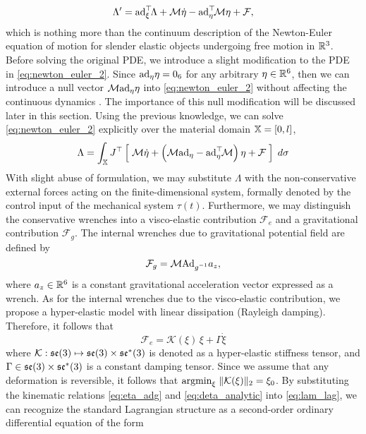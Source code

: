 %
\begin{equation}
\Lambda' =  \text{ad}_{{\xi}}^\top \! \Lambda + \mathcal{M} \dot{{\eta}} - \text{ad}_{{\eta}}^\top \! \mathcal{M} {\eta}  +  \mathcal{F}, \label{eq:newton_euler_2}
\end{equation}
%
which is nothing more than the continuum description of the Newton-Euler equation of motion for slender elastic objects undergoing free motion in $\mathbb{R}^3$. Before solving the original PDE, we introduce a slight modification to the PDE in \eqref{eq:newton_euler_2}. Since $\text{ad}_{\eta} \eta = 0_6$ for any arbitrary $\eta \in \mathbb{R}^6$, then we can introduce a null vector $\mathcal{M}\text{ad}_{\eta} \eta$ into \eqref{eq:newton_euler_2} without affecting the continuous dynamics \cite{Garofalo2013}. The importance of this null modification will be discussed later in this section. Using the previous knowledge, we can solve \eqref{eq:newton_euler_2} explicitly over the material domain $\mathbb{X}= [0,l]$,
%
\begin{equation}
\Lambda = \int_{\mathbb{X}} J^\top \left[ \; {}\mathcal{M} \dot{{\eta}} + \left(\mathcal{M} \text{ad}_{\eta}  - \text{ad}_{{\eta}}^\top \! \mathcal{M}\right) {\eta}  +  \mathcal{F} \; \right] \; d\sigma
\label{eq:lam_lag}
\end{equation}
%
\noindent With slight abuse of formulation, we may substitute $\Lambda$ with the non-conservative external forces acting on the finite-dimensional system, formally denoted by the control input of the mechanical system $\tau(t)$. Furthermore, we may distinguish the conservative wrenches into a visco-elastic contribution $\mathcal{F}_e$ and a gravitational contribution $\mathcal{F}_g$. The internal wrenches due to gravitational potential field are defined by
\begin{equation}
\mathcal{F}_g = \mathcal{M} \Ad_{g\inv} a_z,
\end{equation}
where $a_z \in \mathbb{R}^6$ is a constant gravitational acceleration vector expressed as a wrench. As for the internal wrenches due to the visco-elastic contribution, we propose a hyper-elastic model with linear dissipation (Rayleigh damping). Therefore, it follows that
%
\begin{equation}
\mathcal{F}_e = \mathcal{K}(\xi)\,\xi +  \Gamma \dot{\xi} 
\end{equation}
%
where $\mathcal{K}: {\mathfrak{se}(3)} \mapsto {\mathfrak{se}(3)} \times {\mathfrak{se}^*(3)}$ is denoted as a hyper-elastic stiffness tensor, and $\Gamma \in {\mathfrak{se}(3)} \times {\mathfrak{se}^*(3)}$ is a constant damping tensor. Since we assume that any deformation is reversible, it follows that $\textnormal{argmin}_{\xi}  \; \Vert \mathcal{K}(\xi) \Vert_2 = \xi_0$. By substituting the kinematic relations \eqref{eq:eta_adg} and \eqref{eq:deta_analytic} into \eqref{eq:lam_lag}, we can recognize the standard Lagrangian structure as a second-order ordinary differential equation of the form 
